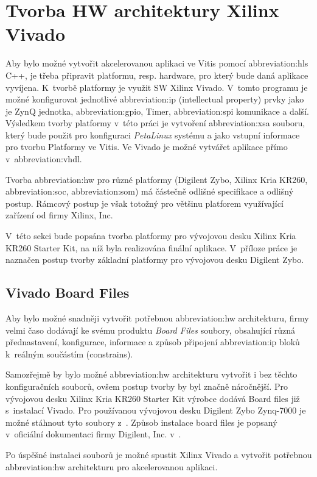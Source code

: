 \documentclass[a4paper, twoside, 11pt]{article}
\begin{document}
	\section{Tvorba HW architektury Xilinx Vivado}
		Aby bylo možné vytvořit akcelerovanou aplikaci ve Vitis pomocí \gls{abbreviation:hls} C++, je třeba připravit platformu, resp. hardware, pro který bude daná aplikace vyvíjena. K~tvorbě platformy je využit SW Xilinx Vivado. V~tomto programu je možné konfigurovat jednotlivé \gls{abbreviation:ip} (intellectual property) prvky jako je ZynQ jednotka, \gls{abbreviation:gpio}, Timer, \gls{abbreviation:spi} komunikace a další. Výsledkem tvorby platformy v~této práci je vytvoření \gls{abbreviation:xsa} souboru, který bude použit pro konfiguraci \textit{PetaLinux} systému a jako vstupní informace pro tvorbu Platformy ve Vitis. Ve Vivado je možné vytvářet aplikace přímo v~\gls{abbreviation:vhdl}.\par
		Tvorba \gls{abbreviation:hw} pro různé platformy (Digilent Zybo, Xilinx Kria KR260, \gls{abbreviation:soc}, \gls{abbreviation:som}) má částečně odlišné specifikace a odlišný postup. Rámcový postup je však totožný pro většinu platforem využívající zařízení od firmy Xilinx, Inc.\par
		V~této sekci bude popsána tvorba platformy pro vývojovou desku Xilinx Kria KR260 Starter Kit, na níž byla realizována finální aplikace. V~příloze práce je naznačen postup tvorby základní platformy pro vývojovou desku Digilent Zybo.\par

		\subsection{Vivado Board Files}\label{subsec:vivado-board-files}
			Aby bylo možné snadněji vytvořit potřebnou \gls{abbreviation:hw} architekturu, firmy velmi časo dodávají ke svému produktu \textit{Board Files} soubory, obsahující různá přednastavení, konfigurace, informace a způsob připojení \gls{abbreviation:ip} bloků k~reálným součástím (constrains). \cite{github-vivado-board-files-for-digilent-fpga-boards}\par
			Samozřejmě by bylo možné \gls{abbreviation:hw} architekturu vytvořit i bez těchto konfiguračních souborů, ovšem postup tvorby by byl značně náročnější. Pro vývojovou desku Xilinx Kria KR260 Starter Kit výrobce dodává Board files již s~instalací Vivado. Pro používanou vývojovou desku Digilent Zybo Zynq-7000 je možné stáhnout tyto soubory z~\cite{github-vivado-board-files-for-digilent-fpga-boards}. Způsob instalace board files je popsaný v~oficiální dokumentaci firmy Digilent, Inc. v~\cite{digilent-installing-vivado-vitis-and-digilent-board-files}.\par
			Po úspěšné instalaci souborů je možné spustit Xilinx Vivado a vytvořit potřebnou \gls{abbreviation:hw} architekturu pro akcelerovanou aplikaci.\par
			
\end{document}

